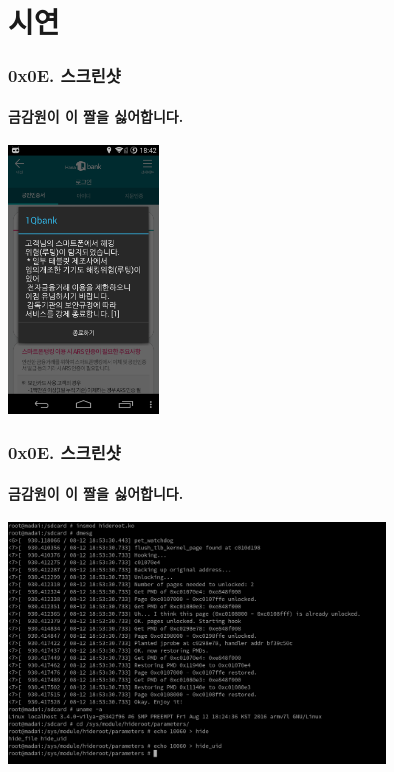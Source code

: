\section[Section]{시연}
\begin{frame}
  \frametitle{0x0E. 스크린샷}
  \framesubtitle{금감원이 이 짤을 싫어합니다.}

  \begin{center}
    \includegraphics [width=40mm]{img/Hana1Qroot.png}
  \end{center}
\end{frame}

\begin{frame}
  \frametitle{0x0E. 스크린샷}
  \framesubtitle{금감원이 이 짤을 싫어합니다.}

  \begin{center}
    \includegraphics [width=100mm]{img/hideroot_init.png}
  \end{center}
\end{frame}

